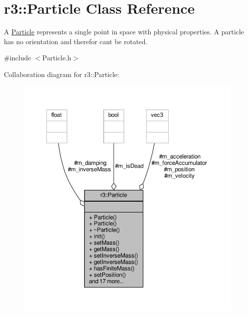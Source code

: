 \hypertarget{classr3_1_1_particle}{}\section{r3\+:\+:Particle Class Reference}
\label{classr3_1_1_particle}


A \mbox{\hyperlink{classr3_1_1_particle}{Particle}} represents a single point in space with physical properties. A particle has no orientation and therefor can\textquotesingle{}t be rotated.  




{\ttfamily \#include $<$Particle.\+h$>$}



Collaboration diagram for r3\+:\+:Particle\+:\nopagebreak
\begin{figure}[H]
\begin{center}
\leavevmode
\includegraphics[width=350pt]{classr3_1_1_particle__coll__graph}
\end{center}
\end{figure}
